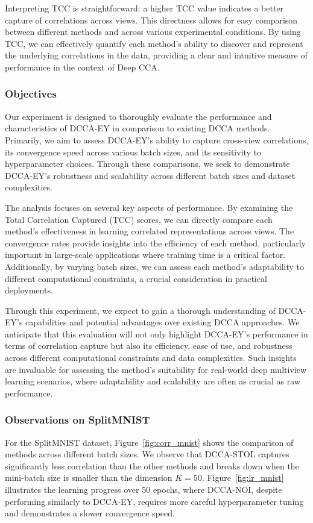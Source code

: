 Interpreting TCC is straightforward: a higher TCC value indicates a better capture of correlations across views. This directness allows for easy comparison between different methods and across various experimental conditions. By using TCC, we can effectively quantify each method's ability to discover and represent the underlying correlations in the data, providing a clear and intuitive measure of performance in the context of Deep CCA.

\subsubsection{Objectives}

Our experiment is designed to thoroughly evaluate the performance and characteristics of DCCA-EY in comparison to existing DCCA methods. Primarily, we aim to assess DCCA-EY's ability to capture cross-view correlations, its convergence speed across various batch sizes, and its sensitivity to hyperparameter choices. Through these comparisons, we seek to demonstrate DCCA-EY's robustness and scalability across different batch sizes and dataset complexities.

The analysis focuses on several key aspects of performance. By examining the Total Correlation Captured (TCC) scores, we can directly compare each method's effectiveness in learning correlated representations across views. The convergence rates provide insights into the efficiency of each method, particularly important in large-scale applications where training time is a critical factor. Additionally, by varying batch sizes, we can assess each method's adaptability to different computational constraints, a crucial consideration in practical deployments.

Through this experiment, we expect to gain a thorough understanding of DCCA-EY's capabilities and potential advantages over existing DCCA approaches. We anticipate that this evaluation will not only highlight DCCA-EY's performance in terms of correlation capture but also its efficiency, ease of use, and robustness across different computational constraints and data complexities. Such insights are invaluable for assessing the method's suitability for real-world deep multiview learning scenarios, where adaptability and scalability are often as crucial as raw performance.

\subsubsection{Observations on SplitMNIST}
For the SplitMNIST dataset, Figure~\ref{fig:corr_mnist} shows the comparison of methods across different batch sizes.
We observe that DCCA-STOL captures significantly less correlation than the other methods and breaks down when the mini-batch size is smaller than the dimension $K=50$.
Figure~\ref{fig:lr_mnist} illustrates the learning progress over 50 epochs, where DCCA-NOI, despite performing similarly to DCCA-EY, requires more careful hyperparameter tuning and demonstrates a slower convergence speed.

